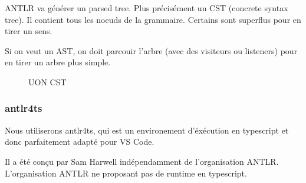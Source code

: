\documentclass[
    iict, %
    il, %
]{heig-tb}
\begin{document}

ANTLR va générer un parsed tree. Plus précisément un CST (concrete syntax tree).
Il contient tous les noeuds de la grammaire. Certains sont superflus pour en tirer un sens.

Si on veut un AST, on doit parcouir l'arbre (avec des visiteurs ou listeners) pour en tirer un arbre plus simple.

\begin{figure}[!h]
    \begin{center}
    \end{center}
    \caption[UON CST]{\label{uon-tree} UON CST}
\end{figure}

\subsubsection{antlr4ts}
Nous utiliserons antlr4ts, qui est un environement d'éxécution en typescript et donc parfaitement adapté pour VS Code.

Il a été conçu par Sam Harwell indépendamment de l'organisation ANTLR.
L'organisation ANTLR ne proposant pas de runtime en typescript. %

\end{document}
